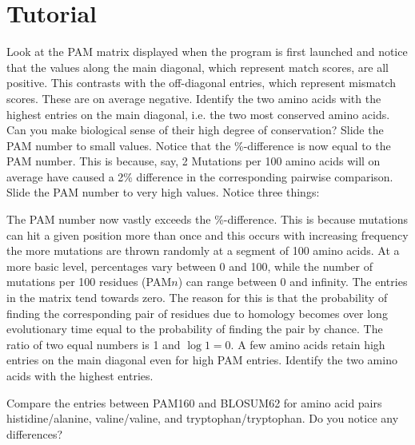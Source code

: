 \section{Tutorial}
\begin{enumerate}
  \I Look at the PAM matrix displayed when the program is first
  launched and notice that the values along
  the main diagonal, which represent match scores, are all
  positive. This contrasts with the off-diagonal entries, which
  represent mismatch scores. These are on
  average negative. Identify the two amino acids with the highest entries on
  the main diagonal, i.e. the two most conserved amino
  acids. Can you make biological sense of their high degree of conservation?
  \I Slide the PAM number to small values. Notice that the
  \%-difference is now equal to the PAM number. This is because, say,
  2 Mutations per 100 amino acids will on average have caused a 2\%
  difference in the corresponding pairwise comparison.
  \I Slide the PAM number to very high values. Notice three things:
  \begin{enumerate}
    \I The PAM number now vastly exceeds the \%-difference. This is
    because mutations can hit a given position more than once and this 
    occurs with increasing frequency the more mutations are thrown
    randomly at a segment of 100 amino acids. At a more basic level,
    percentages vary between 0 and 100, while the number of mutations
    per 100 residues (PAM$n$) 
    can range between 0 and infinity.
    \I The entries in the matrix tend towards zero. The reason for
    this is that the probability of finding the corresponding pair of
    residues due
    to homology becomes over long evolutionary time equal to the
    probability of finding the pair by chance. The ratio of two equal
    numbers is 1 and $\log{1} = 0$.
    \I A few amino acids retain high entries on the main diagonal even
    for high PAM entries. Identify the two amino acids with the
    highest entries.
  \end{enumerate}
  \I Compare the entries between PAM160 and BLOSUM62 for amino acid
  pairs histidine/alanine, valine/valine, and
  tryptophan/tryptophan. Do you notice any differences? 
\end{enumerate}





